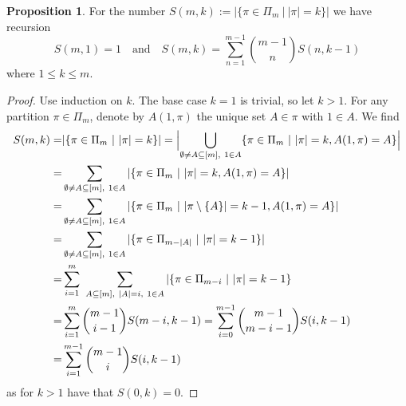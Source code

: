 \documentclass{scrartcl}
\theoremstyle{definition}
\newtheorem{proposition}[definition]{Proposition}
\begin{document}
\begin{proposition}
    \label{prop:partitions_recursion}
    For the number $S(m, k) := |\{ \pi \in \Pi_m \ | \ |\pi| = k\}|$ we have recursion
    \begin{equation*}
        S(m, 1) = 1 \quad \text{and} \quad S(m, k) = \sum_{n = 1}^{m - 1} {m - 1 \choose n} S(n, k - 1)
    \end{equation*}
    where $1 \leq k \leq m$.
\end{proposition}
\begin{proof}
    Use induction on $k$. 
    The base case $k = 1$ is trivial, so let $k > 1$.
    For any partition $\pi \in \Pi_m$, denote by $A(1, \pi)$ the unique set $A \in \pi$ with $1 \in A$.
    We find
    \begin{align*}
        S(m, k) =& |\{ \pi \in \Pi_m \ | \ |\pi| = k \}| = \Bigl| \bigcup_{\emptyset \neq A \subseteq [m], \ 1 \in A} \{ \pi \in \Pi_m \ | \ |\pi| = k, A(1, \pi) = A \} \Bigr| \\
        =& \sum_{\emptyset \neq A \subseteq [m], \ 1 \in A} |\{ \pi \in \Pi_m \ | \ |\pi| = k, A(1, \pi) = A \}| \\
        =& \sum_{\emptyset \neq A \subseteq [m], \ 1 \in A} |\{ \pi \in \Pi_m \ | \ |\pi \setminus \{A\}| = k - 1, A(1, \pi) = A\}| \\
        =& \sum_{\emptyset \neq A \subseteq [m], \ 1 \in A} |\{ \pi \in \Pi_{m - |A|} \ | \ |\pi| = k - 1 \}| \\
        =& \sum_{i = 1}^m \ \sum_{A \subseteq [m], \ |A| = i, \ 1 \in A} |\{ \pi \in \Pi_{m - i} \ | \ |\pi| = k - 1 \} \\
        =& \sum_{i = 1}^m {m - 1 \choose i - 1} S(m - i, k - 1) = \sum_{i = 0}^{m - 1} {m - 1 \choose m - i - 1} S(i, k - 1) \\
        =& \sum_{i = 1}^{m - 1} {m - 1 \choose i} S(i, k - 1)
    \end{align*}
    as for $k > 1$ have that $S(0, k) = 0$.
\end{proof}
\end{document}
